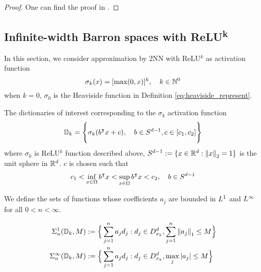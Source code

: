 \begin{proof}
    One can find the proof in
    \cite{klusowskiApproximationCombinationsReLU2018,siegelSharpBoundsApproximation2022}.
\end{proof}


\subsection{Infinite-width Barron spaces with ReLU\textsuperscript{k}}

In this section, we consider approximation by 2NN with ReLU$^k$ as activation
function
\begin{equation}
    \sigma_k(x) = [\max(0, x)]^k, \quad k \in \mathbb{N}^0
\end{equation}
when $k = 0$, $\sigma_0$ is the Heaviside function in Definition
\ref{eq:heaviside_represent}.



The dictionaries of interest corresponding to the $\sigma_k$ activation function
\begin{equation}
    \mathbb{D}_{k} = \Bigg\{
        \sigma_k(b{}^{\intercal} x + c), \quad b\in S^{d-1}, c\in [c_1, c_2] 
    \Bigg\}
\end{equation}
where $\sigma_k$ is ReLU$^k$ function described above, $S^{d-1} := \{x\in\mathbb{R}^d:
\left\| x \right\|_2 = 1\}$ is the unit sphere in $\mathbb{R}^d$. $c$ is chosen such that
\begin{equation}
    c_1 < \inf_{x\in\Omega} b{}^{\intercal} x < 
    \sup_{x\in\Omega} b{}^{\intercal} x < c_2, \quad
    b \in S^{d-1}
\end{equation}

We define the sets of functions whose coefficients $a_j$ are bounded in $L^{1}$
and $L^{\infty}$ for all $0 < n < \infty$.

\begin{align*}
    \Sigma_n^1(\mathbb{D}_k, M) &:= \Big\{
        \sum_{j=1}^n a_j d_j:
        d_j \in D^d_{\sigma_k}, \sum_{j=1}^n \left\| a_j \right\|_1 \leq M 
    \Big\} \\
    \Sigma_n^{\infty}(\mathbb{D}_k, M) &:= \Big\{
        \sum_{j=1}^n a_j d_j:
        d_j \in D^d_{\sigma_k}, \max_{j} \left| a_j \right| \leq M 
    \Big\}
\end{align*}

